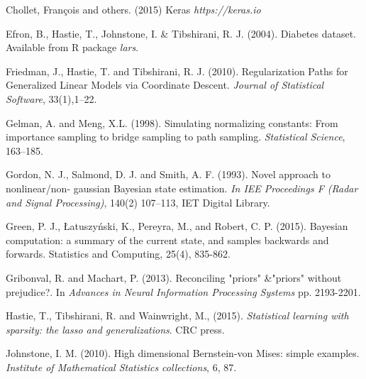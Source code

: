 \documentclass[12pt]{TD-CJS}
\begin{document}
\begin{thebibliography}{}
Chollet, Fran\c{c}ois and others. (2015) Keras {\it https://keras.io}

Efron, B., Hastie, T., Johnstone, I. \& Tibshirani, R. J. (2004).  Diabetes dataset. Available from R package {\it lars}.

Friedman, J.,  Hastie, T. and  Tibshirani, R. J. (2010). Regularization Paths for Generalized Linear Models via Coordinate Descent. {\it Journal of Statistical Software}, 33(1),1--22.

Gelman, A. and Meng, X.L. (1998). Simulating normalizing constants: From importance sampling to bridge sampling to path sampling. {\it Statistical Science}, 163--185.

Gordon, N. J.,  Salmond, D. J. and  Smith, A. F. (1993). Novel approach to nonlinear/non- gaussian Bayesian state estimation. {\it In IEE Proceedings F (Radar and Signal Processing)}, 140(2) 107--113, IET Digital Library.


Green, P. J., {\L}atuszy{\'n}ski, K., Pereyra, M., and Robert, C. P. (2015). Bayesian computation: a summary of the current state, and samples backwards and forwards. Statistics and Computing, 25(4), 835-862.

Gribonval, R. and Machart, P. (2013). 
Reconciling "priors" \&"priors" without prejudice?. In {\em Advances in Neural Information Processing Systems} 
pp. 2193-2201.


Hastie, T., Tibshirani, R. and Wainwright, M., (2015). {\em Statistical learning with sparsity: the lasso and generalizations}. CRC press.


Johnstone, I. M. (2010). High dimensional Bernstein-von Mises: simple examples. {\it Institute of Mathematical Statistics collections}, 6, 87.


\end{thebibliography}
\end{document}
